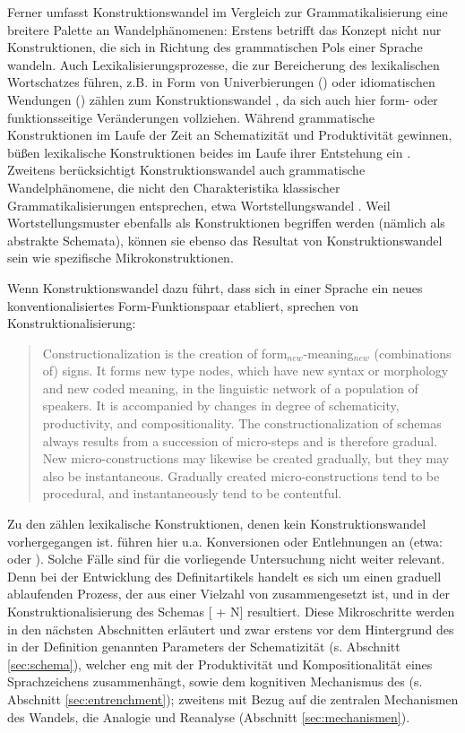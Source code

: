 Ferner umfasst Konstruktionswandel im Vergleich zur Grammatikalisierung  eine breitere Palette an Wandelphänomenen: Erstens betrifft das Konzept nicht nur Konstruktionen, die sich in Richtung des grammatischen Pols einer Sprache wandeln. Auch Lexikalisierungsprozesse, die zur Bereicherung des lexikalischen Wortschatzes führen, z.B. in Form von Univerbierungen () oder idiomatischen Wendungen () zählen zum Konstruktionswandel \parencite[64]{Hilpert2011}, da sich auch hier form- oder funktionsseitige Veränderungen vollziehen. Während grammatische Konstruktionen im Laufe der Zeit an Schematizität und Produktivität gewinnen, büßen lexikalische Konstruktionen beides im Laufe ihrer Entstehung ein \parencite[vgl.][164]{Traugott2013}. Zweitens berücksichtigt Konstruktionswandel auch grammatische Wandelphänomene, die nicht den Charakteristika klassischer Grammatikalisierungen entsprechen, etwa Wortstellungswandel \parencite[vgl.][65]{Hilpert2011}. Weil Wortstellungsmuster ebenfalls als Konstruktionen begriffen werden (nämlich als abstrakte Schemata), können sie ebenso das Resultat von Konstruktionswandel sein wie spezifische Mikrokonstruktionen. 

Wenn Konstruktionswandel dazu führt, dass sich in einer Sprache ein neues konventionalisiertes Form-Funktionspaar etabliert, sprechen \textcite{Traugott2013} von Konstruktionalisierung: \blockcquote[22]{Traugott2013}{Constructionalization is the creation of form$_{new}$-meaning$_{new}$ (combinations of) signs. It forms new type nodes, which have new syntax or morphology and new coded meaning, in the linguistic network of a population of speakers. It is accompanied by changes in degree of schematicity,
productivity, and compositionality. The constructionalization of schemas
always results from a succession of micro-steps and is therefore gradual.
New micro-constructions may likewise be created gradually, but they may
also be instantaneous. Gradually created micro-constructions tend to be
procedural, and instantaneously tend to be
contentful.}

\noindent
Zu den  zählen lexikalische Konstruktionen, denen kein Konstruktionswandel vorhergegangen ist. \textcite[3]{Traugott2013} führen hier u.a. Konversionen oder Entlehnungen an (etwa:  oder ). Solche Fälle sind für die vorliegende Untersuchung nicht weiter relevant. Denn bei der Entwicklung des Definitartikels handelt es sich um einen graduell ablaufenden Prozess, der aus einer Vielzahl von  zusammengesetzt ist, und in der Konstruktionalisierung des Schemas  [ + N]  resultiert. Diese Mikroschritte werden in den nächsten Abschnitten erläutert und zwar erstens vor dem Hintergrund des in der Definition genannten Parameters der Schematizität (s. Abschnitt \ref{sec:schema}), welcher eng mit der Produktivität und Kompositionalität eines Sprachzeichens zusammenhängt, sowie dem kognitiven Mechanismus des   (s.  Abschnitt \ref{sec:entrenchment}); zweitens mit Bezug auf die zentralen Mechanismen des Wandels, die Analogie und Reanalyse (Abschnitt \ref{sec:mechanismen}). 

